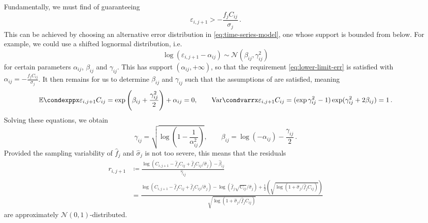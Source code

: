 \documentclass[a4paper]{book}
\begin{document}
Fundamentally, we must find of guaranteeing
\begin{equation} \label{eq:lower-limit-err}
  \varepsilon_{i, j + 1} > -\frac{f_j C_{ij}}{\sigma_j} \,.
\end{equation}
This can be achieved by choosing an alternative error distribution in \cref{eq:time-series-model}, one whose support is bounded from below. For example, we could use a shifted lognormal distribution, i.e.
\begin{equation}
  \log(\varepsilon_{i, j + 1} - \alpha_{ij}) \sim \mathcal{N}(\beta_{ij}, \gamma_{ij}^2)
\end{equation} 
for certain parameters $\alpha_{ij}$, $\beta_{ij}$ and $\gamma_{ij}$. This has support $(\alpha_{ij}, +\infty)$, so that the requirement \cref{eq:lower-limit-err} is satisfied with $\alpha_{ij} = -\frac{f_j C_{ij}}{\sigma_j}$. It then remains for us to determine $\beta_{ij}$ and $\gamma_{ij}$ such that the assumptions of  are satisfied, meaning
\begin{equation}
  \condexpp{\varepsilon_{i, j + 1}}{C_{ij}} = \exp \left( \beta_{ij} + \frac{\gamma_{ij}^2}{2} \right) + \alpha_{ij} = 0, \qquad \condvarr{\varepsilon_{i, j + 1}}{C_{ij}} = (\exp{\gamma_{ij}^2} - 1) \exp(\gamma_{ij}^2 + 2 \beta_{ij}) = 1 \,.
\end{equation}
Solving these equations, we obtain
\begin{equation}
  \gamma_{ij} = \sqrt{\log \left( 1 - \frac{1}{\alpha^2_{ij}} \right)}, \qquad \beta_{ij} = \log(-\alpha_{ij}) - \frac{\gamma_{ij}}{2} \,.
\end{equation}
Provided the sampling variability of $\widehat{f}_j$ and $\widehat{\sigma}_j$ is not too severe, this means that the residuals
\begin{align}
  r_{i, j + 1} 
  &\coloneqq \frac{\log \left( C_{i, j + 1} - \widehat{f}_j C_{ij} + \widehat{f}_j C_{ij} / \widehat{\sigma}_j \right) - \widehat{\beta}_{ij}}{\widehat{\gamma}_{ij}} \\
  &= \frac{\log \left( C_{i, j + 1} - \widehat{f}_j C_{ij} + \widehat{f}_j C_{ij} / \widehat{\sigma}_j \right) - \log(\widehat{f}_j \sqrt{C_{ij}} / \widehat{\sigma}_j) + \frac{1}{2} \left( \sqrt{\log \left( 1 + \widehat{\sigma}_j / \widehat{f}_j C_{ij} \right)} \right)}{\sqrt{\log \left( 1 + \widehat{\sigma}_j / \widehat{f}_j C_{ij} \right)}}
\end{align}
are approximately $\mathcal{N}(0, 1)$-distributed.
\end{document}
